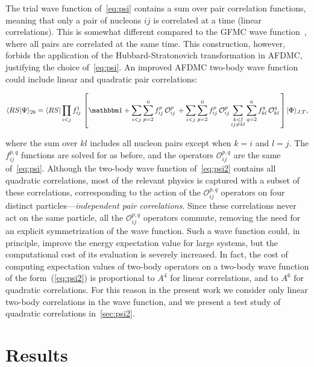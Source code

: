 \documentclass[aps,prc,twocolumn,superscriptaddress,floatfix]{revtex4-1}
\begin{document}
The trial wave function of~\cref{eq:psi} contains a sum over pair correlation functions, 
meaning that only a pair of nucleons $ij$ is correlated at a time (linear correlations).
This is somewhat different compared to the GFMC wave function~\cite{Carlson:2015}, 
where all pairs are correlated at the same time. This construction, however, forbids the 
application of the Hubbard-Stratonovich transformation in AFDMC, justifying the choice
of~\cref{eq:psi}. An improved AFDMC two-body wave function could include linear and
quadratic pair correlations: 
\begin{widetext}
\begin{align}
\langle RS|\Psi\rangle_{2b}=\langle RS|\prod_{i<j}f^1_{ij}\,
\left[\mathbbm1+\sum_{i<j}\sum_{p=2}^6 f^p_{ij}\,\mathcal O_{ij}^p\,
+\sum_{i<j}\sum_{p=2}^6 f^p_{ij}\,\mathcal O_{ij}^p \sum_{\substack{k<l\\ij\ne kl}}\sum_{q=2}^6 f^q_{kl}\,\mathcal O_{kl}^q\,\right]|\Phi\rangle_{J,T} ,
\label{eq:psi2}
\end{align}
\end{widetext}
where the sum over $kl$ includes all nucleon pairs except when $k=i$ and $l=j$. 
The $f^{p,q}_{ij}$ functions are solved for as before, and the operators 
$\mathcal{O}^{p,q}_{ij}$ are the same of~\cref{eq:psi}. 
Although the two-body wave function of~\cref{eq:psi2} contains all quadratic correlations, 
most of the relevant physics is captured with a subset of these correlations, corresponding
to the action of the $\mathcal O_{ij}^{p,q}$ operators on four distinct 
particles---\emph{independent pair correlations}. Since these correlations never act on the same 
particle, all the $\mathcal{O}^{p,q}_{ij}$ operators commute, removing the need for an explicit 
symmetrization of the wave function. Such a wave function could, in principle, improve
the energy expectation value for large systems, but the computational cost of its evaluation is
severely increased. In fact, the cost of computing expectation values of two-body operators on
a two-body wave function of the form~(\ref{eq:psi2}) is proportional to $A^4$ for linear correlations, 
and to $A^6$ for quadratic correlations.
For this reason in the present work we consider only linear two-body correlations in the wave function, 
and we present a test study of quadratic correlations in~\cref{sec:psi2}. 


\section{Results}
\label{sec:res}
\end{document}
